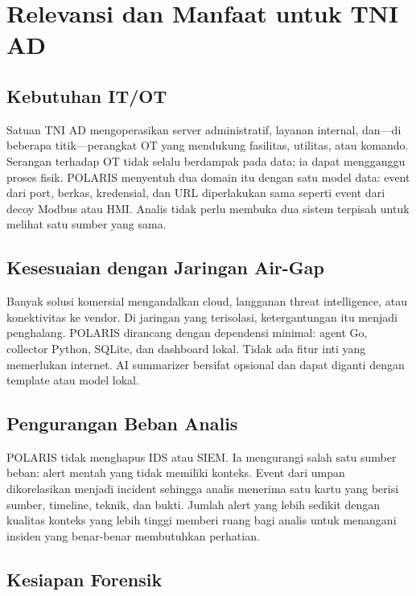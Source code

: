 \documentclass[12pt,a4paper]{article}
\begin{document}
\section{Relevansi dan Manfaat untuk TNI AD}

\subsection{Kebutuhan IT/OT}

Satuan TNI AD mengoperasikan server administratif, layanan internal, dan---di beberapa titik---perangkat OT yang mendukung fasilitas, utilitas, atau komando. Serangan terhadap OT tidak selalu berdampak pada data; ia dapat mengganggu proses fisik. POLARIS menyentuh dua domain itu dengan satu model data: event dari port, berkas, kredensial, dan URL diperlakukan sama seperti event dari decoy Modbus atau HMI. Analis tidak perlu membuka dua sistem terpisah untuk melihat satu sumber yang sama.

\subsection{Kesesuaian dengan Jaringan Air-Gap}

Banyak solusi komersial mengandalkan cloud, langganan threat intelligence, atau konektivitas ke vendor. Di jaringan yang terisolasi, ketergantungan itu menjadi penghalang. POLARIS dirancang dengan dependensi minimal: agent Go, collector Python, SQLite, dan dashboard lokal. Tidak ada fitur inti yang memerlukan internet. AI summarizer bersifat opsional dan dapat diganti dengan template atau model lokal.

\subsection{Pengurangan Beban Analis}

POLARIS tidak menghapus IDS atau SIEM. Ia mengurangi salah satu sumber beban: alert mentah yang tidak memiliki konteks. Event dari umpan dikorelasikan menjadi incident sehingga analis menerima satu kartu yang berisi sumber, timeline, teknik, dan bukti. Jumlah alert yang lebih sedikit dengan kualitas konteks yang lebih tinggi memberi ruang bagi analis untuk menangani insiden yang benar-benar membutuhkan perhatian.

\subsection{Kesiapan Forensik}
\end{document}
